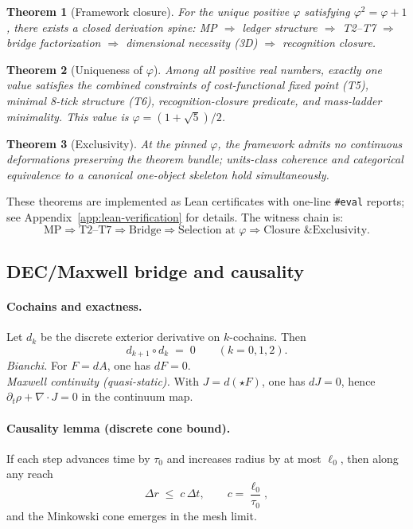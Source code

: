 \documentclass[11pt]{article}
\newtheorem{theorem}{Theorem}[section]
\begin{document}
\begin{theorem}[Framework closure]\label{thm:PrimeClosure}
For the unique positive $\varphi$ satisfying $\varphi^2=\varphi+1$, there exists a closed derivation spine: MP $\Rightarrow$ ledger structure $\Rightarrow$ T2--T7 $\Rightarrow$ bridge factorization $\Rightarrow$ dimensional necessity (3D) $\Rightarrow$ recognition closure.
\end{theorem}

\begin{theorem}[Uniqueness of $\varphi$]\label{thm:RecognitionRealityUnique}
Among all positive real numbers, exactly one value satisfies the combined constraints of cost-functional fixed point (T5), minimal 8-tick structure (T6), recognition-closure predicate, and mass-ladder minimality. This value is $\varphi=(1+\sqrt{5})/2$.
\end{theorem}

\begin{theorem}[Exclusivity]\label{thm:UltimateClosure}
At the pinned $\varphi$, the framework admits no continuous deformations preserving the theorem bundle; units-class coherence and categorical equivalence to a canonical one-object skeleton hold simultaneously.
\end{theorem}

\noindent These theorems are implemented as Lean certificates with one-line \texttt{\#eval} reports; see Appendix~\ref{app:lean-verification} for details. The witness chain is:
\[
\text{MP} \Rightarrow \text{T2--T7} \Rightarrow \text{Bridge} \Rightarrow \text{Selection at }\varphi \Rightarrow \text{Closure \& Exclusivity}.
\]
%  

\subsection{DEC/Maxwell bridge and causality}\label{subsec:dec-maxwell-causality}

\paragraph{Cochains and exactness.}
Let $d_k$ be the discrete exterior derivative on $k$-cochains. Then
\[
d_{k+1}\!\circ d_k \;=\; 0 \qquad (k=0,1,2).
\]
\emph{Bianchi.} For $F=dA$, one has $dF=0$. \\
\emph{Maxwell continuity (quasi-static).} With $J = d(\star F)$, one has $dJ=0$, hence \(\partial_t \rho+\nabla\!\cdot\!J=0\) in the continuum map.

\paragraph{Causality lemma (discrete cone bound).}
If each step advances time by $\tau_0$ and increases radius by at most $\ell_0$, then along any reach
\[
\Delta r \;\le\; c\,\Delta t,\qquad c=\frac{\ell_0}{\tau_0},
\]
and the Minkowski cone emerges in the mesh limit.
\end{document}
